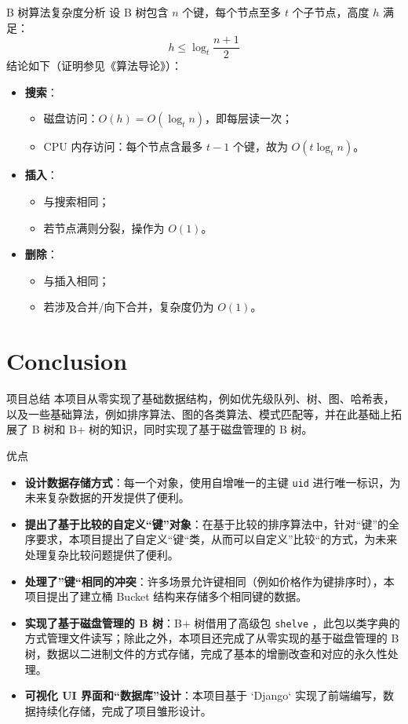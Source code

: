 \documentclass{beamer}
\begin{document}
\begin{frame}{B 树算法复杂度分析}
设 B 树包含 $n$ 个键，每个节点至多 $t$ 个子节点，高度 $h$ 满足：
\[
h \leq \log_t \frac{n+1}{2}
\]
结论如下（证明参见《算法导论》）：
\begin{itemize}
  \item \textbf{搜索}：
  \begin{itemize}
    \item 磁盘访问：$O(h) = O(\log_t n)$，即每层读一次；
    \item CPU 内存访问：每个节点含最多 $t - 1$ 个键，故为 $O(t \log_t n)$。
  \end{itemize}
  \item \textbf{插入}：
  \begin{itemize}
    \item 与搜索相同；
    \item 若节点满则分裂，操作为 $O(1)$。
  \end{itemize}
  \item \textbf{删除}：
  \begin{itemize}
    \item 与插入相同；
    \item 若涉及合并/向下合并，复杂度仍为 $O(1)$。
  \end{itemize}
\end{itemize}
\end{frame}

\section{Conclusion}

\begin{frame}{项目总结}
本项目从零实现了基础数据结构，例如优先级队列、树、图、哈希表，以及一些基础算法，例如排序算法、图的各类算法、模式匹配等，并在此基础上拓展了 B 树和 B+ 树的知识，同时实现了基于磁盘管理的 B 树。
\end{frame}

\begin{frame}{优点}
\begin{itemize}
  \item \textbf{设计数据存储方式}：每一个对象，使用自增唯一的主键 \texttt{uid} 进行唯一标识，为未来复杂数据的开发提供了便利。
  \item \textbf{提出了基于比较的自定义“键”对象}：在基于比较的排序算法中，针对“键”的全序要求，本项目提出了自定义“键“类，从而可以自定义”比较“的方式，为未来处理复杂比较问题提供了便利。
  \item \textbf{处理了”键“相同的冲突}：许多场景允许键相同（例如价格作为键排序时），本项目提出了建立桶 Bucket 结构来存储多个相同键的数据。
  \item \textbf{实现了基于磁盘管理的 B 树}：B+ 树借用了高级包 \texttt{shelve} ，此包以类字典的方式管理文件读写；除此之外，本项目还完成了从零实现的基于磁盘管理的 B 树，数据以二进制文件的方式存储，完成了基本的增删改查和对应的永久性处理。
  \item \textbf{可视化 UI 界面和“数据库”设计}：本项目基于 `Django` 实现了前端编写，数据持续化存储，完成了项目雏形设计。
\end{itemize}
\end{frame}
\end{document}
